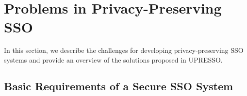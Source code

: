 ﻿\section{Problems in Privacy-Preserving SSO}
\label{sec:challenge}



In this section, we describe the challenges for developing privacy-preserving SSO systems and provide an overview of the solutions proposed in UPRESSO.


\subsection{Basic Requirements of a Secure SSO System}
\label{subsec:basicrequirements}


